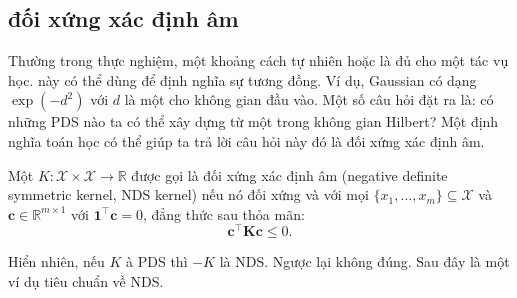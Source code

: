 \subsection{\protect{} đối xứng xác định âm}

Thường trong thực nghiệm, một khoảng cách tự nhiên hoặc  là đủ cho
một tác vụ học.  này có thể dùng để định nghĩa sự tương đồng. Ví dụ,
 Gaussian có dạng $\exp(-d^2)$ với $d$ là một  cho không
gian  đầu vào. Một số câu hỏi đặt ra là: có những  PDS
nào ta có thể xây dựng từ một  trong không gian Hilbert? Một định
nghĩa toán học có thể giúp ta trả lời câu hỏi này đó là  đối xứng
xác định âm.

\begin{defn}
  Một  $K\colon \mathcal{X} \times \mathcal{X} \to \mathbb{R}$ được
  gọi là  đối xứng xác định âm (negative definite symmetric kernel,
  NDS kernel) nếu nó đối xứng và với mọi $\{x_1, \dots, x_m\} \subseteq
  \mathcal{X}$ và $\mathbf{c} \in \mathbb{R}^{m \times 1}$ với
  $\mathbf{1}^\intercal \mathbf{c} = 0$, đẳng thức sau thỏa mãn:
  \begin{equation}
    \mathbf{c}^\intercal \mathbf{K} \mathbf{c} \le 0.
  \end{equation}
\end{defn}

Hiển nhiên, nếu $K$ à PDS thì $-K$ là NDS. Ngược lại không đúng. Sau đây là một
ví dụ tiêu chuẩn về  NDS.

